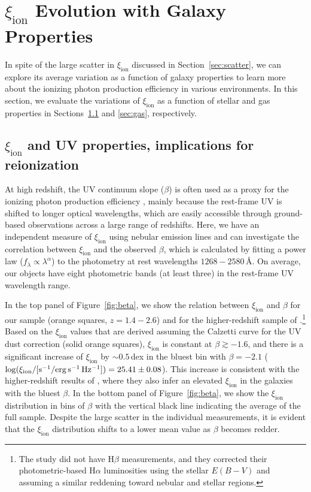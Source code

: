 \documentclass[iop]{emulateapj}
\newcommand{\xiion}{\ensuremath{\xi_{\mathrm{ion}}}}
\newcommand{\halpha}{H\ensuremath{\alpha}}
\newcommand{\hbeta}{H\ensuremath{\beta}}
\begin{document}
\section{{\xiion} Evolution with Galaxy Properties}
\label{sec:avg}

In spite of the large scatter in {\xiion} discussed in Section~\ref{sec:scatter}, we can explore its average variation as a function of galaxy properties to learn more about the ionizing photon production efficiency in various environments. 
In this section, we evaluate the variations of {\xiion} as a function of stellar and gas properties in Sections~\ref{sec:uv} and \ref{sec:gas}, respectively. 

\subsection{{\xiion} and UV properties, implications for reionization}
\label{sec:uv}

At high redshift, the UV continuum slope ($\beta$) is often used as a proxy for the ionizing photon production efficiency \citep[e.g.,][]{robertson13,duncan15}, mainly because the rest-frame UV is shifted to longer optical wavelengths, which are easily accessible through ground-based observations across a large range of redshifts. 
Here, we have an independent measure of {\xiion} using nebular emission lines and can investigate the correlation between {\xiion} and the observed $\beta$, which is calculated by fitting a power law ($f_{\lambda}\propto \lambda^{\alpha}$) to the photometry at rest wavelengths $1268-2580$\,\AA. On average, our objects have eight photometric bands (at least three) in the rest-frame UV wavelength range.

In the top panel of Figure~\ref{fig:beta}, we show the relation between {\xiion} and $\beta$ for our sample (orange squares, $z=1.4-2.6$) and for the higher-redshift sample of \citet[][violet diamonds, $z=3.8-5.0$]{bouwens16b}.\footnote{The \citet{bouwens16b} study did not have {\hbeta} measurements, and they corrected their photometric-based {\halpha} luminosities using the stellar $E(B-V)$ and assuming a similar reddening toward nebular and stellar regions.}
Based on the {\xiion} values that are derived assuming the Calzetti curve for the UV dust correction (solid orange squares), {\xiion} is constant at $\beta \gtrsim -1.6$, and there is a significant increase of {\xiion} by $\sim 0.5$\,dex in the bluest bin with $\beta=-2.1$ ($\log(\xi_{\rm{ion}}/[{\rm{s^{-1}/erg\,s^{-1}\,Hz^{-1}}}])=25.41\pm 0.08$). This increase is consistent with the higher-redshift results of \citet{bouwens16b}, where they also infer an elevated {\xiion} in the galaxies with the bluest $\beta$. In the bottom panel of Figure~\ref{fig:beta}, we show the {\xiion} distribution in bins of $\beta$ with the vertical black line indicating the average of the full sample. Despite the large scatter in the individual measurements, it is evident that the {\xiion} distribution shifts to a lower mean value as $\beta$ becomes redder.
\end{document}
